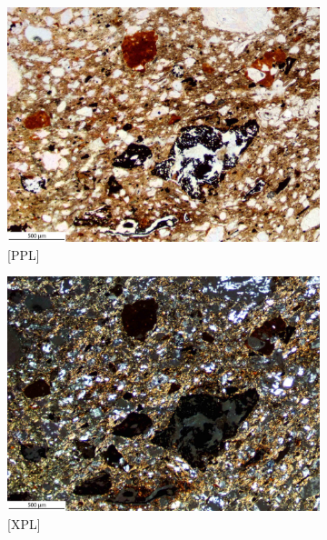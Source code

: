 \documentclass[a4paper]{article}
\begin{document}
\begin{figure}[H]
	\centering
	\begin{subfigure}[t]{.49\textwidth}
		\includegraphics[width=\textwidth]{ThinSections/10-8_4x_PPL.jpg}
		\caption{[PPL]}
	\end{subfigure}\hspace{.5em}\hfill
	\begin{subfigure}[t]{.49\textwidth}
		\includegraphics[width=\textwidth]{ThinSections/10-8_4x_XPL.jpg}
		\caption{[XPL]}
	\end{subfigure}
	\begin{subfigure}[t]{.32\textwidth}

\end{subfigure}
\end{figure}
\end{document}
